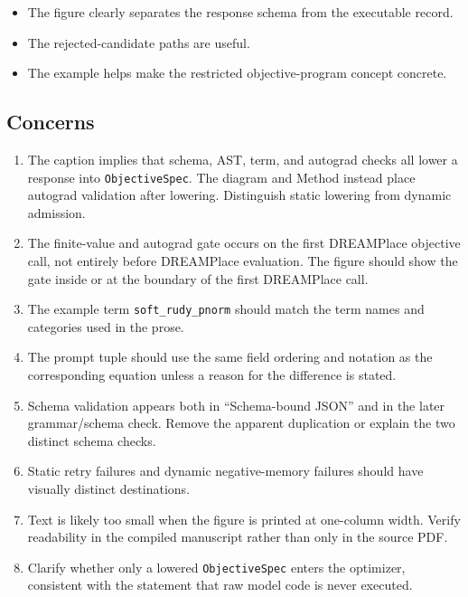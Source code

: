 \documentclass[11pt]{article}
\begin{document}
\begin{itemize}
  \item The figure clearly separates the response schema from the executable
  record.
  \item The rejected-candidate paths are useful.
  \item The example helps make the restricted objective-program concept
  concrete.
\end{itemize}

\subsection{Concerns}

\begin{enumerate}
  \item The caption implies that schema, AST, term, and autograd checks all
  lower a response into \texttt{ObjectiveSpec}. The diagram and Method instead
  place autograd validation after lowering. Distinguish static lowering from
  dynamic admission.

  \item The finite-value and autograd gate occurs on the first DREAMPlace
  objective call, not entirely before DREAMPlace evaluation. The figure should
  show the gate inside or at the boundary of the first DREAMPlace call.

  \item The example term \texttt{soft\_rudy\_pnorm} should match the term names
  and categories used in the prose.

  \item The prompt tuple should use the same field ordering and notation as the
  corresponding equation unless a reason for the difference is stated.

  \item Schema validation appears both in ``Schema-bound JSON'' and in the
  later grammar/schema check. Remove the apparent duplication or explain the
  two distinct schema checks.

  \item Static retry failures and dynamic negative-memory failures should have
  visually distinct destinations.

  \item Text is likely too small when the figure is printed at one-column
  width. Verify readability in the compiled manuscript rather than only in the
  source PDF.

  \item Clarify whether only a lowered \texttt{ObjectiveSpec} enters the
  optimizer, consistent with the statement that raw model code is never
  executed.
\end{enumerate}
\end{document}
